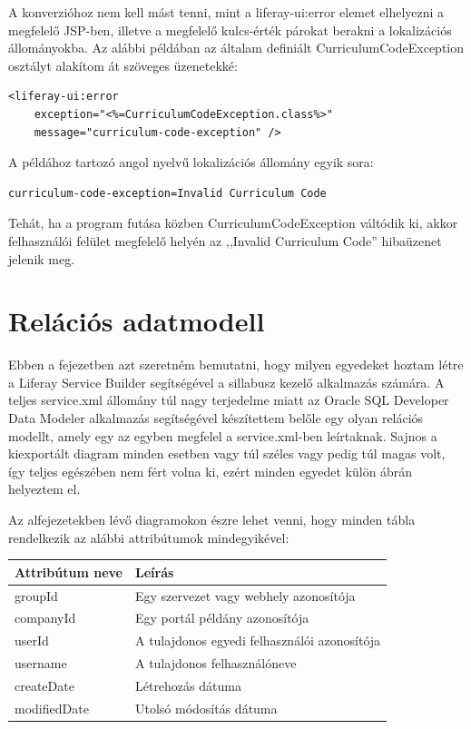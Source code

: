 \documentclass[hidelinks, 12pt, a4paper]{report}
\begin{document}
A konverzióhoz nem kell mást tenni, mint a liferay-ui:error elemet elhelyezni a megfelelő JSP-ben, illetve a megfelelő kulcs-érték párokat berakni a lokalizációs állományokba. Az alábbi példában az általam definiált CurriculumCodeException osztályt alakítom át szöveges üzenetekké:

\begin{lstlisting}[style=customxml]
<liferay-ui:error
	exception="<%=CurriculumCodeException.class%>"
	message="curriculum-code-exception" />
\end{lstlisting}

\noindent A példához tartozó angol nyelvű lokalizációs állomány egyik sora:

\begin{lstlisting}[style=customjava]
curriculum-code-exception=Invalid Curriculum Code
\end{lstlisting}

\noindent Tehát, ha a program futása közben CurriculumCodeException váltódik ki, akkor felhasználói felület megfelelő helyén az ,,Invalid Curriculum Code'' hibaüzenet jelenik meg.

\section{Relációs adatmodell}

Ebben a fejezetben azt szeretném bemutatni, hogy milyen egyedeket hoztam létre a Liferay Service Builder segítségével a sillabusz kezelő alkalmazás számára. A teljes service.xml állomány túl nagy terjedelme miatt az Oracle SQL Developer Data Modeler alkalmazás segítségével készítettem belőle egy olyan relációs modellt, amely egy az egyben megfelel a service.xml-ben leírtaknak. Sajnos a kiexportált diagram minden esetben vagy túl széles vagy pedig túl magas volt, így teljes egészében nem fért volna ki, ezért minden egyedet külön ábrán helyeztem el.

Az alfejezetekben lévő diagramokon észre lehet venni, hogy minden tábla rendelkezik az alábbi attribútumok mindegyikével:

\begin{table}[H]
	\centering
	\begin{tabular}{| l | l |}
	\hline
	\textbf{Attribútum neve} & \textbf{Leírás} \\
	\hline
	groupId & Egy szervezet vagy webhely azonosítója \\
	\hline
	companyId & Egy portál példány azonosítója \\
	\hline
	userId & A tulajdonos egyedi felhasználói azonosítója \\
	\hline
	username & A tulajdonos felhasználóneve \\
	\hline
	createDate & Létrehozás dátuma \\
	\hline
	modifiedDate & Utolsó módosítás dátuma \\
	\hline
\end{tabular}
\end{table}
\end{document}

